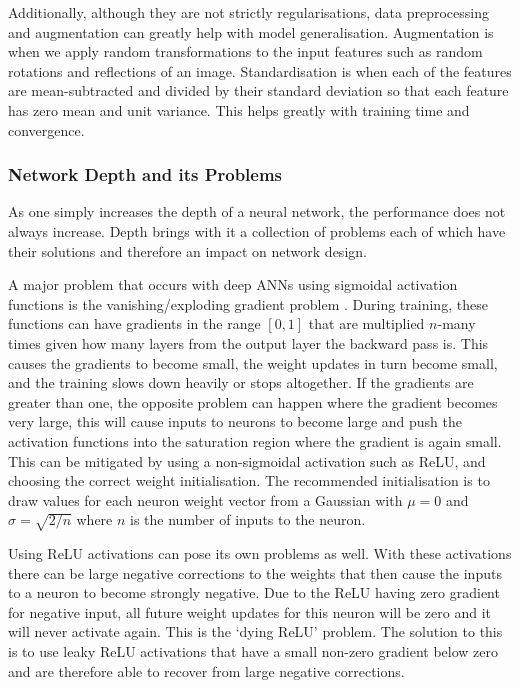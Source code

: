 Additionally, although they are not strictly regularisations, data preprocessing and augmentation can greatly help with model generalisation. Augmentation is when we apply random transformations to the input features such as random rotations and reflections of an image. Standardisation is when each of the features are mean-subtracted and divided by their standard deviation so that each feature has zero mean and unit variance. This helps greatly with training time and convergence. 


\subsubsection{Network Depth and its Problems}
As one simply increases the depth of a neural network, the performance does not always increase. Depth brings with it a collection of problems each of which have their solutions and therefore an impact on network design. 

A major problem that occurs with deep ANNs using sigmoidal activation functions is the vanishing/exploding gradient problem \cite{VanishingGradient}. During training, these functions can have gradients in the range $[0,1]$ that are multiplied $n$-many times given how many layers from the output layer the backward pass is. This causes the gradients to become small, the weight updates in turn become small, and the training slows down heavily or stops altogether. If the gradients are greater than one, the opposite problem can happen where the gradient becomes very large, this will cause inputs to neurons to become large and push the activation functions into the saturation region where the gradient is again small. 
This can be mitigated by using a non-sigmoidal activation such as ReLU, and choosing the correct weight initialisation. The recommended initialisation \cite{CS231n,HeEtAl} is to draw values for each neuron weight vector from a Gaussian with $\mu=0$ and $\sigma=\sqrt{2/n}$ where $n$ is the number of inputs to the neuron.

Using ReLU activations can pose its own problems as well. With these activations there can be large negative corrections to the weights that then cause the inputs to a neuron to become strongly negative. 
Due to the ReLU having zero gradient for negative input, all future weight updates for this neuron will be zero and it will never activate again. This is the `dying ReLU' problem.
The solution to this is to use leaky ReLU activations \cite{LeakyRelu} that have a small non-zero gradient below zero and are therefore able to recover from large negative corrections. 

